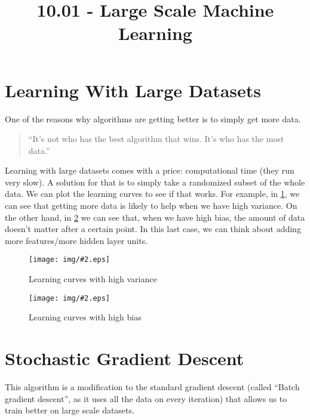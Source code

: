 \documentclass[10pt]{extarticle}
\newcommand{\stdfig}[3]{
    \begin{figure}
    \centering
    \texttt{[image: img/\#2.eps]}
    \caption{#3}
    \label{fig:#2}
    \end{figure}
}
\begin{document}
 



\title{10.01 - Large Scale Machine Learning}

    
    \date{}
    

    

    \maketitle

\newpage





\section{Learning With Large
Datasets}\label{learning-with-large-datasets}

One of the reasons why algorithms are getting better is to simply get
more data.

\begin{quote}
``It's not who has the best algorithm that wins. It's who has the most
data.''
\end{quote}

Learning with large datasets comes with a price: computational time
(they run very slow). A solution for that is to simply take a randomized
subset of the whole data. We can plot the learning curves to see if that
works. For example, in \cref{fig:learning_curves_high_variance}, we can
see that getting more data is likely to help when we have high variance.
On the other hand, in \cref{fig:learning_curves_high_bias} we can see
that, when we have high bias, the amount of data doesn't matter after a
certain point. In this last case, we can think about adding more
features/more hidden layer units.

\stdfig{7cm}{learning_curves_high_variance}{Learning curves with high variance}

\stdfig{7cm}{learning_curves_high_bias}{Learning curves with high bias}

\section{Stochastic Gradient Descent}\label{stochastic-gradient-descent}

This algorithm is a modification to the standard gradient descent
(called ``Batch gradient descent'', as it uses all the data on every
iteration) that allows us to train better on large scale datasets.
\smallskip
\end{document}

